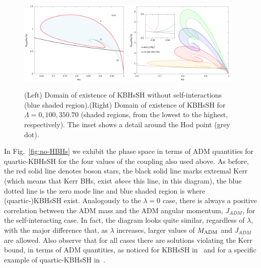 \begin{figure}[h!]
  \begin{center}
    \includegraphics[width=0.48\textwidth]{papers/selfInteractions/w-vs-M-0.png}
    \includegraphics[width=0.48\textwidth]{papers/selfInteractions/BH-w-Mtimes4.png}
      \end{center}
  \caption{(Left) Domain of existence of KBHsSH without self-interactions (blue shaded region).(Right) Domain of existence of KBHsSH for $\Lambda=0,100,350.70$ (shaded regions, from the lowest to the highest, respectively). The inset shows a detail around the Hod point (grey dot).}
  \label{kbhsh1}
\end{figure}


In Fig.~\ref{fig:no-HBHs} we exhibit the phase space in terms of ADM quantities for quartic-KBHsSH for the four values of the coupling also used above. As before, the red solid line denotes boson stars, the black solid line marks extremal Kerr (which means that Kerr BHs, exist \textit{above} this line, in this diagram), the blue dotted line is the zero mode line and blue shaded region is where (quartic-)KBHsSH exist. Analogously to the $\lambda=0$ case, there is always a positive correlation between the ADM mass and the ADM angular momentum, $J_{ADM}$, for the self-interacting case. In fact, the diagram looks quite similar, regardless of $\lambda$, with the major difference that, as $\lambda$ increases, larger values of $M_{\rm ADM}$ and $J_{ADM}$ are allowed. Also observe that for all cases there are solutions violating the Kerr bound, in terms of ADM quantities, as noticed for KBHsSH in~\cite{Herdeiro:2014goa,Herdeiro:2015moa} and for a specific example of quartic-KBHsSH in~\cite{Kleihaus:2015iea}.



